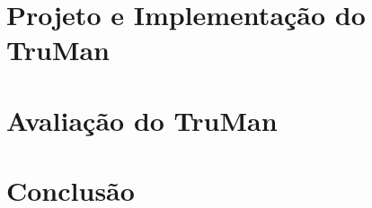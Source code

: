 \begin{resumoextendido}
	\section*{Projeto e Implementação do TruMan}
	
	\section*{Avaliação do TruMan}
	
	\section*{Conclusão}
\end{resumoextendido}